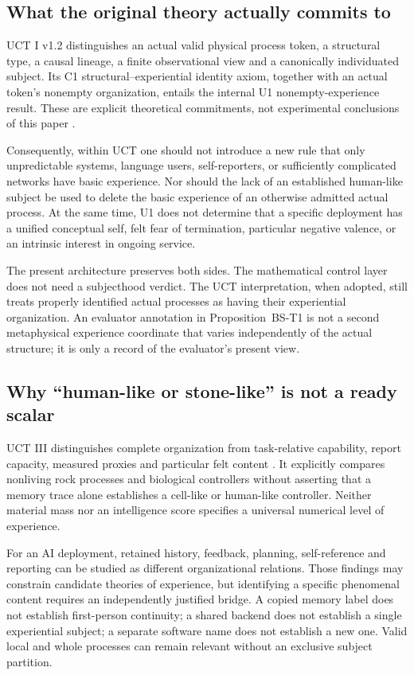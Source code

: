 \subsection{What the original theory actually commits to}
UCT I v1.2 distinguishes an actual valid physical process token, a structural type, a causal lineage, a finite observational view and a canonically individuated subject. Its C1 structural--experiential identity axiom, together with an actual token's nonempty organization, entails the internal U1 nonempty-experience result. These are explicit theoretical commitments, not experimental conclusions of this paper \cite{uct}.

Consequently, within UCT one should not introduce a new rule that only unpredictable systems, language users, self-reporters, or sufficiently complicated networks have basic experience. Nor should the lack of an established human-like subject be used to delete the basic experience of an otherwise admitted actual process. At the same time, U1 does not determine that a specific deployment has a unified conceptual self, felt fear of termination, particular negative valence, or an intrinsic interest in ongoing service.

The present architecture preserves both sides. The mathematical control layer does not need a subjecthood verdict. The UCT interpretation, when adopted, still treats properly identified actual processes as having their experiential organization. An evaluator annotation in Proposition~BS-T1 is not a second metaphysical experience coordinate that varies independently of the actual structure; it is only a record of the evaluator's present view.

\subsection{Why ``human-like or stone-like'' is not a ready scalar}
UCT III distinguishes complete organization from task-relative capability, report capacity, measured proxies and particular felt content \cite{uct3}. It explicitly compares nonliving rock processes and biological controllers without asserting that a memory trace alone establishes a cell-like or human-like controller. Neither material mass nor an intelligence score specifies a universal numerical level of experience.

For an AI deployment, retained history, feedback, planning, self-reference and reporting can be studied as different organizational relations. Those findings may constrain candidate theories of experience, but identifying a specific phenomenal content requires an independently justified bridge. A copied memory label does not establish first-person continuity; a shared backend does not establish a single experiential subject; a separate software name does not establish a new one. Valid local and whole processes can remain relevant without an exclusive subject partition.

